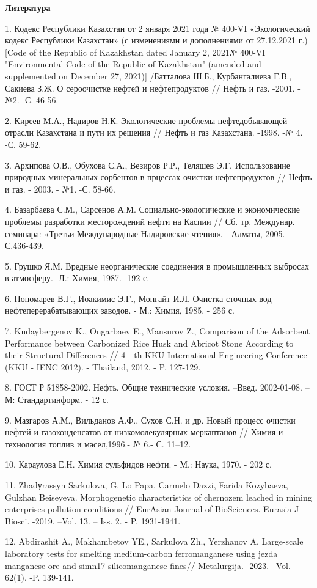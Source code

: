 \begin{center}
{\bfseries Литература}
\end{center}

\begin{noparindent}
1.
  Кодекс Республики Казахстан от 2 января 2021 года № 400-VI
  «Экологический кодекс Республики Казахстан» (с изменениями и
  дополнениями от 27.12.2021 г.) {[}Code of the Republic of Kazakhstan
  dated January 2, 2021№ 400-VI "Environmental Code of the Republic of
  Kazakhstan" (amended and supplemented on December 27, 2021){]}
  /Батталова Ш.Б., Курбангалиева Г.В., Сакиева З.Ж. О сероочистке нефтей
  и нефтепродуктов // Нефть и газ. -2001. -№2. -С. 46-56.

2.
  Киреев М.А., Надиров Н.К. Экологические проблемы нефтедобывающей
  отрасли Казахстана и пути их решения // Нефть и газ Казахстана. -1998.
  -№ 4. -С. 59-62.

3.
  Архипова О.В., Обухова С.А., Везиров Р.Р., Теляшев Э.Г. Использование
  природных минеральных сорбентов в прцессах очистки нефтепродуктов //
  Нефть и газ. - 2003. - №1. -С. 58-66.

4.
  Базарбаева С.М., Сарсенов А.М. Социально-экологические и экономические
  проблемы разработки месторождений нефти на Каспии // Сб. тр. Междунар.
  семинара: «Третьи Международные Надировские чтения». - Алматы, 2005. -
  С.436-439.

5.
  Грушко Я.М. Вредные неорганические соединения в промышленных выбросах
  в атмосферу. -Л.: Химия, 1987. -192 с.

6.
  Пономарев В.Г., Иоакимис Э.Г., Монгайт И.Л. Очистка сточных вод
  нефтеперерабатывающих заводов. - М.: Химия, 1985. - 256 с.

7.
  Kudaybergenov K., Ongarbaev E., Mansurov Z., Comparison of the
  Adsorbent Performance between Carbonized Rice Husk and Abricot Stone
  According to their Structural Differences // 4 - th KKU International
  Engineering Conference (KKU - IENC 2012). - Thailand, 2012. - P.
  127-129.

8.
  ГОСТ Р 51858-2002. Нефть. Общие технические условия. --Введ.
  2002-01-08. --М: Стандартинформ. - 12 с.

9.
  Мазгаров А.М., Вильданов А.Ф., Сухов С.Н. и др. Новый процесс очистки
  нефтей и газоконденсатов от низкомолекулярных меркаптанов // Химия и
  технология топлив и масел,1996.- № 6.- С. 11--12.

10.
  Караулова Е.Н. Химия сульфидов нефти. - М.: Наука, 1970. - 202 с.

11.
  Zhadуrassyn Sarkulova, G. Lo Papa, Carmelo Dazzi, Farida Kozybaeva,
  Gulzhan Beiseyeva. Morphogenetic characteristics of chernozem leached
  in mining enterprises pollution conditions // EurAsian Journal of
  BioSciences. Eurasia J Biosci. -2019. --Vol. 13. -- Iss. 2. - P.
  1931-1941.

12.
  Abdirashit A., Makhambetov YE., Sarkulova Zh., Yerzhanov A.
  Large-scale laboratory tests for smelting medium-carbon ferromanganese
  using jezda manganese ore and simn17 silicomanganese fines//
  Metalurgija. -2023. --Vol. 62(1). -P. 139-141.
\end{noparindent}

